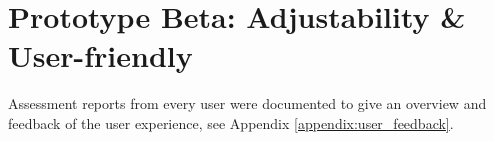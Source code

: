 \chapter{Prototype Beta: Adjustability \& User-friendly}

Assessment reports from every user were documented to give an overview and feedback of the user experience, see Appendix \ref{appendix:user_feedback}.
